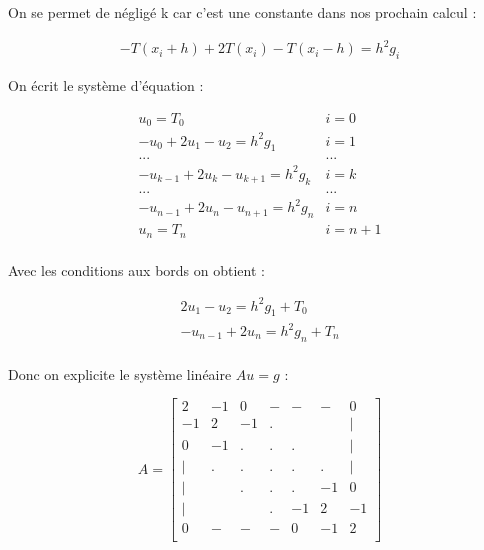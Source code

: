 \documentclass[11pt]{article}
\begin{document}
On se permet de négligé k car c'est une constante dans nos prochain calcul :

\begin{equation*}
  \begin{split}
    - T(x_i + h) + 2 T(x_i) - T(x_i - h) = h^2 g_i
  \end{split}
\end{equation*}

On écrit le système d'équation : 

\begin{equation*}
  \begin{array}{ll}
    u_0 = T_0 & i = 0 \\
    - u_0 + 2 u_1 - u_2 = h^2 g_1 & i = 1\\
    ... & ... \\
    - u_{k-1} + 2 u_k - u_{k+1} = h^2 g_k & i = k\\
    ... & ... \\
    - u_{n-1} + 2 u_n - u_{n+1} = h^2 g_n & i = n\\
    u_n = T_n & i = n + 1 \\
  \end{array}
\end{equation*}

Avec les conditions aux bords on obtient :

\begin{equation*}
  \begin{array}{l}
    2 u_1 - u_2 = h^2 g_1 + T_0 \\
    - u_{n-1} + 2 u_n = h^2 g_n + T_n \\
  \end{array}
\end{equation*}

Donc on explicite le système linéaire $Au = g$ :

\begin{equation*}
  A = \left[
    \begin{array}{ccccccc}
      2 & -1 & 0 & - & - & - & 0 \\
      -1 & 2 & -1 & . &  &  & |  \\
      0 & -1 & . & . & . &  & |  \\
      | & . & . & . & . & . & |  \\
      | & & . & . & . & -1 & 0  \\
      | & & & . & -1 & 2 & -1  \\
      0 & - & - & - & 0 & -1 & 2 \\
    \end{array}
    \right]
\end{equation*}
\end{document}
